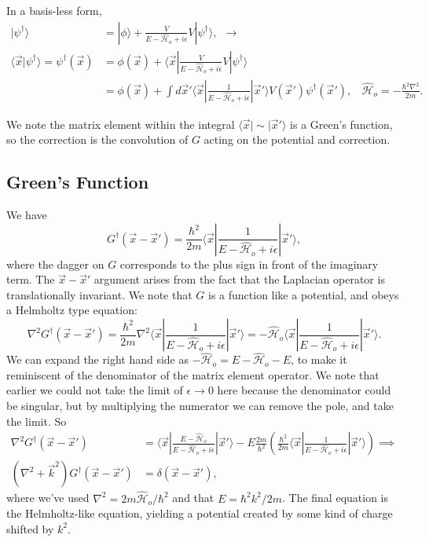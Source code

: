 \documentclass[fontsize=12pt]{scrartcl}
\newcommand{\la}{\langle}
\newcommand{\ra}{\rangle}
\newcommand{\Ham}{\hat{\mathcal{H}}}
\begin{document}
In a basis-less form, \begin{align*}
|\psi^\dagger\ra &= |\phi\ra + \frac{V}{E-\Ham_o+i\epsilon}V|\psi^\dagger\ra, \ \ \to \\ \la\vec{x}|\psi^\dagger\ra = \psi^\dagger(\vec{x}) &= \phi(\vec{x}) + \la \vec{x}|\frac{V}{E-\Ham_o+i\epsilon}V|\psi^\dagger\ra\\
&= \phi(\vec{x}) + \int d\vec{x}' \la \vec{x}|\frac{1}{E-\Ham_o+i\epsilon}|\vec{x}'\ra V(\vec{x}')\psi^\dagger(\vec{x}'), \ \ \ \ \Ham_o=-\frac{\hbar^2\nabla^2}{2m}.
\end{align*}

We note the matrix element within the integral $\la \vec{x}|\sim|\vec{x}'\ra$ is a Green's function, so the correction is the convolution of $G$ acting on the potential and correction.

\subsection{Green's Function}

We have $$G^\dagger(\vec{x}-\vec{x}') = \frac{\hbar^2}{2m}\la\vec{x} | \frac{1}{E-\Ham_o + i\epsilon} |\vec{x}'\ra,$$ where the dagger on $G$ corresponds to the plus sign in front of the imaginary term. The $\vec{x}-\vec{x}'$ argument arises from the fact that the Laplacian operator is translationally invariant. We note that $G$ is a function like a potential, and obeys a Helmholtz type equation: $$\nabla^2 G^\dagger(\vec{x}-\vec{x}') = \frac{\hbar^2}{2m}\nabla^2 \la \vec{x} | \frac{1}{E-\Ham_o+i\epsilon}|\vec{x}'\ra = -\Ham_o\la\vec{x}| \frac{1}{E-\Ham_o+i\epsilon}|\vec{x}'\ra.$$ We can expand the right hand side as $-\Ham_o = E-\Ham_o-E$, to make it reminiscent of the denominator of the matrix element operator. We note that earlier we could not take the limit of $\epsilon\to 0$ here because the denominator could be singular, but by multiplying the numerator we can remove the pole, and take the limit. So \begin{align*}
\nabla^2 G^\dagger(\vec{x}-\vec{x}') &= \la\vec{x}|\frac{E-\Ham_o}{E-\Ham_o+i\epsilon} |\vec{x}'\ra - E\frac{2m}{\hbar^2} \left(\frac{\hbar^2}{2m}\la\vec{x}|\frac{1}{E-\Ham_o+i\epsilon}|\vec{x}'\ra\right) \implies \\
(\nabla^2+\vec{k}^2)G^\dagger(\vec{x}-\vec{x}') &= \delta(\vec{x}-\vec{x}'),
\end{align*} where we've used $\nabla^2 = 2m\Ham_o/\hbar^2$ and that $E=\hbar^2k^2/2m$. The final equation is the Helmholtz-like equation, yielding a potential created by some kind of charge shifted by $k^2$. 
\end{document}
